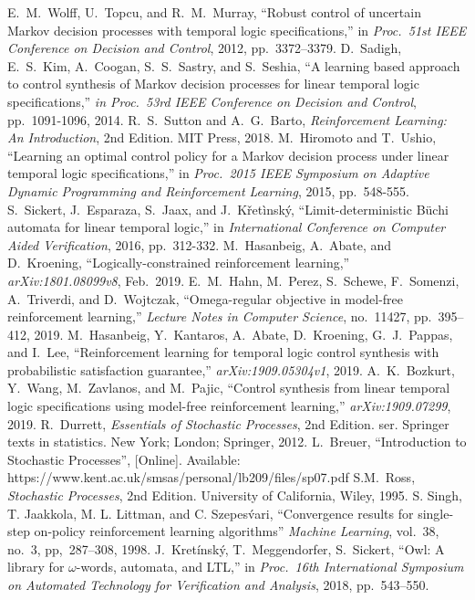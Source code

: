 \documentclass[a4j,12pt,oneside,openany,english,dvipdfmx]{jsbook}
\begin{document}
\begin{thebibliography}{99}
  E.\ M.\ Wolff, U.\ Topcu, and R.\ M.\ Murray,
  ``Robust control of uncertain Markov decision processes with temporal logic specifications,''
  in \textit{Proc.\ 51st IEEE Conference on Decision and Control}, 2012, pp.\ 3372--3379.
  D.\ Sadigh, E.\ S.\ Kim, A.\ Coogan, S.\ S.\ Sastry, and S.\ Seshia,
  ``A learning based approach to control synthesis of Markov decision processes for linear temporal logic specifications,''
  \textit{in Proc.\ 53rd IEEE Conference on Decision and Control}, pp.\ 1091-1096, 2014.
  R.\ S.\ Sutton and A.\ G.\ Barto,
  \textit{Reinforcement Learning: An Introduction}, 2nd Edition.
  MIT Press, 2018.
  M.\ Hiromoto and T.\ Ushio,
  ``Learning an optimal control policy for a Markov decision process under linear temporal logic specifications,''
  in \textit{Proc.\ 2015 IEEE Symposium on Adaptive Dynamic Programming and Reinforcement Learning}, 2015, pp.\ 548-555.
  S.\ Sickert, J.\ Esparaza, S.\ Jaax, and J.\ K\v{r}et\`{i}nsk\'{y},
  ``Limit-deterministic B\"{u}chi automata for linear temporal logic,''
   in \textit{International Conference on Computer Aided Verification}, 2016, pp.\ 312-332.
  M.\ Hasanbeig, A.\ Abate, and D.\ Kroening,
  ``Logically-constrained reinforcement learning,'' \textit{arXiv:1801.08099v8}, Feb.\ 2019.
  E.\ M.\ Hahn, M.\ Perez, S.\ Schewe, F.\ Somenzi, A.\ Triverdi, and D.\ Wojtczak,
  ``Omega-regular objective in model-free reinforcement learning,''
  \textit{Lecture Notes in Computer Science}, no.\ 11427, pp.\ 395--412, 2019.
  M.\ Hasanbeig, Y.\ Kantaros, A.\ Abate, D.\ Kroening, G.\ J.\ Pappas, and I.\ Lee,
  ``Reinforcement learning for temporal logic control synthesis with probabilistic satisfaction guarantee,''
  \textit{arXiv:1909.05304v1}, 2019.
  A.\ K.\ Bozkurt, Y.\ Wang, M.\ Zavlanos, and M.\ Pajic,
  ``Control synthesis from linear temporal logic specifications using model-free reinforcement learning,''
  \textit{arXiv:1909.07299}, 2019.
  R.\ Durrett,
  \textit{Essentials of Stochastic Processes}, 2nd Edition. ser. Springer texts in statistics. New York; London; Springer, 2012.
  L.\ Breuer,
  ``Introduction to Stochastic Processes'', [Online]. Available: https://www.kent.ac.uk/smsas/personal/lb209/files/sp07.pdf
  S.M.\ Ross,
  \textit{Stochastic Processes}, 2nd Edition. University of California, Wiley, 1995.
  S. Singh, T. Jaakkola, M. L. Littman, and C. Szepes\'{v}ari,
  ``Convergence results for single-step on-policy reinforcement learning algorithms'' \textit{Machine Learning},
  vol.~38, no.~3, pp,~287--308, 1998.
  J.~Kretínsk\'{y}, T.~Meggendorfer, S.~Sickert, ``Owl: A library for $\omega$-words, automata,
  and LTL,'' in \textit{Proc.~16th International Symposium on Automated Technology for Verification and Analysis}, 2018,  pp.~543–550.
\end{thebibliography}
%
%
\end{document}
